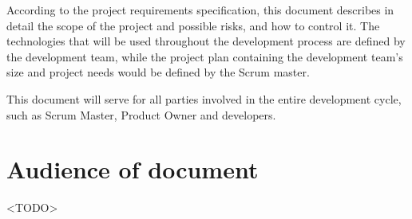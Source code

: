 \documentclass{report}
\begin{document}
   According to the project requirements specification, this document describes in detail the scope of the project and possible risks, and how to control it. The technologies that will be used throughout the development process are defined by the development team, while the project plan containing the development team's size and project needs would be defined by the Scrum master.

   This document will serve for all parties involved in the entire development cycle, such as Scrum Master, Product Owner and developers.

\section{Audience of document}
\label{sec:audienceOfDocument}
<TODO>
\end{document}
